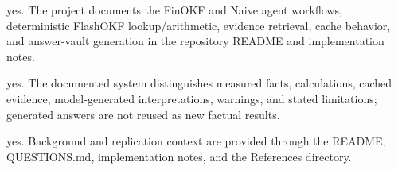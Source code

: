 \documentclass[letterpaper]{article}
\begin{document}
\begin{itemize}

yes. The project documents the FinOKF and Naive agent workflows, deterministic FlashOKF lookup/arithmetic, evidence retrieval, cache behavior, and answer-vault generation in the repository README and implementation notes.

yes. The documented system distinguishes measured facts, calculations, cached evidence, model-generated interpretations, warnings, and stated limitations; generated answers are not reused as new factual results.

yes. Background and replication context are provided through the README, QUESTIONS.md, implementation notes, and the References directory.

\end{itemize}
\end{document}
